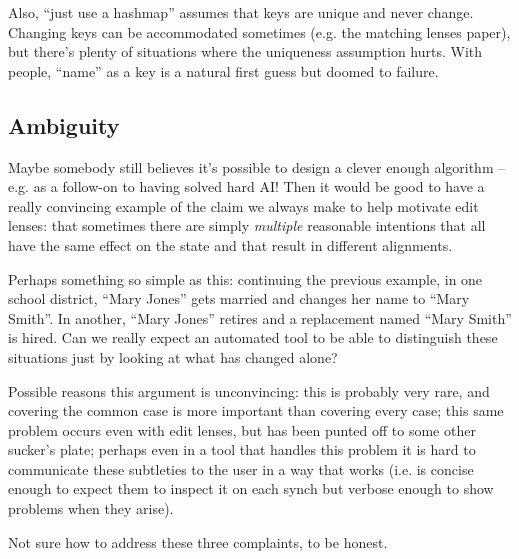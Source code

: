 Also, ``just use a hashmap'' assumes that keys are unique and never change.
Changing keys can be accommodated sometimes (e.g. the matching lenses
paper), but there's plenty of situations where the uniqueness assumption
hurts. With people, ``name'' as a key is a natural first guess but doomed to
failure.

\subsection{Ambiguity}
Maybe somebody still believes it's possible to design a clever enough
algorithm -- e.g. as a follow-on to having solved hard AI! Then it would be
good to have a really convincing example of the claim we always make to help
motivate edit lenses: that sometimes there are simply \emph{multiple}
reasonable intentions that all have the same effect on the state and that
result in different alignments.

Perhaps something so simple as this: continuing the previous example, in one
school district, ``Mary Jones'' gets married and changes her name to ``Mary
Smith''. In another, ``Mary Jones'' retires and a replacement named ``Mary
Smith'' is hired. Can we really expect an automated tool to be able to
distinguish these situations just by looking at what has changed alone?

Possible reasons this argument is unconvincing: this is probably very rare,
and covering the common case is more important than covering every case;
this same problem occurs even with edit lenses, but has been punted off to
some other sucker's plate; perhaps even in a tool that handles this problem
it is hard to communicate these subtleties to the user in a way that works
(i.e. is concise enough to expect them to inspect it on each synch but
verbose enough to show problems when they arise).

Not sure how to address these three complaints, to be honest.
